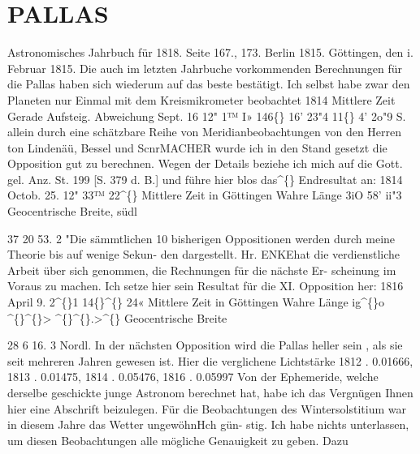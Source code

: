 \documentclass[12pt,a4paper]{article}
\newcommand{\degree}{\textdegree}
\begin{document}
\section*{PALLAS}
Astronomisches  Jahrbuch  für  1818.     Seite  167.,  173.     Berlin  1815. 
Göttingen,  den  i.  Februar  1815. 
Die  auch  im  letzten  Jahrbuche  vorkommenden  Berechnungen  für  die  Pallas  haben  sich  wiederum 
auf    das   beste    bestätigt.     Ich  selbst  habe   zwar    den  Planeten   nur   Einmal  mit  dem  Kreismikrometer 
beobachtet 
1814 
Mittlere  Zeit   Gerade  Aufsteig.     Abweichung 
Sept.  16         12"  1™  I»         146\degree\{\}  16'  23"4         11\degree\{\}  4'  2o"9  S. 
allein  durch  eine  schätzbare  Reihe  von  Meridianbeobachtungen  von  den  Herren  ton  Lindenäü,  Bessel 
und  ScnrMACHER  wurde  ich  in  den  Stand  gesetzt  die  Opposition  gut  zu  berechnen.  Wegen  der  Details 
beziehe  ich  mich  auf  die  Gott.  gel.  Anz.   St.  199  [S.  379  d.  B.]   und  führe  hier  blos  das\textasciicircum\{\}  Endresultat  an: 
1814  Octob.  25.  12"  33™  22\textasciicircum\{\}  Mittlere  Zeit  in  Göttingen 
Wahre  Länge   
3iO  58'    ii"3 
Geocentrische  Breite,  südl 

37    20    53. 2 
"Die  sämmtlichen  10  bisherigen  Oppositionen  werden  durch  meine  Theorie  bis  auf  wenige  Sekun- 
den dargestellt. 
Hr.  ENKEhat  die  verdienstliche  Arbeit  über  sich  genommen,  die  Rechnungen  für  die  nächste  Er- 
scheinung im  Voraus  zu  machen.    Ich  setze  hier  sein  Resultat  für  die  XI.  Opposition  her: 
1816  April  9.  2\textasciicircum\{\}1  14\degree\{\}\textasciicircum\{\}  24«  Mittlere  Zeit  in  Göttingen 
Wahre  Länge   
ig\textasciicircum\{\}o  \textasciicircum\{\}\textasciicircum\{\}>   \textasciicircum\{\}\textasciicircum\{\}.>\textasciicircum\{\} 
Geocentrische  Breite       

28      6     16. 3  Nordl. 
In  der  nächsten  Opposition  wird  die  Pallas  heller  sein ,  als  sie  seit  mehreren  Jahren  gewesen  ist. 
Hier  die  verglichene  Lichtstärke 
1812     .     0.01666,  1813     .     0.01475,  1814     .     0.05476,  1816     .     0.05997 
Von  der  Ephemeride,   welche    derselbe  geschickte  junge  Astronom  berechnet  hat,    habe  ich  das 
Vergnügen  Ihnen  hier  eine  Abschrift  beizulegen. 
Für  die  Beobachtungen  des  Wintersolstitium  war  in  diesem  Jahre  das  Wetter  ungewöhnHch  gün- 
stig.    Ich  habe  nichts  unterlassen,  um  diesen  Beobachtungen  alle  mögliche  Genauigkeit  zu  geben.     Dazu 
\end{document}
